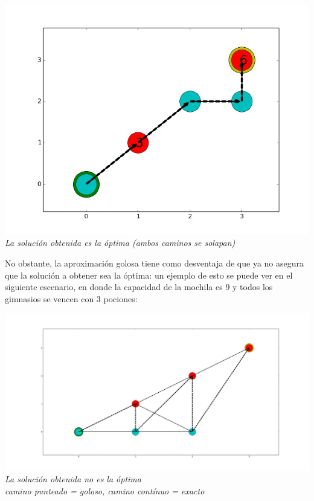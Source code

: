 \vspace*{0.3cm} \vspace*{0.3cm}
  \begin{center}
\includegraphics[scale=0.40]{./EJ2/optima.jpeg}
\\{\textit{La soluci\'on obtenida es la \'optima (ambos caminos se solapan)}}
  \end{center}
  \vspace*{0.3cm}

No obstante, la aproximación golosa tiene como desventaja de que ya no asegura que la solución a obtener sea la óptima: un ejemplo de esto se puede ver en el siguiente escenario, en donde la capacidad de la mochila es 9 y todos los gimnasios se vencen con 3 pociones:

\vspace*{0.3cm} \vspace*{0.3cm}
  \begin{center}
\includegraphics[scale=0.20]{./EJ2/nooptima.jpeg}
\\{\textit{La soluci\'on obtenida no es la \'optima\\ camino punteado = goloso, camino contínuo = exacto}}
  \end{center}
  \vspace*{0.3cm}